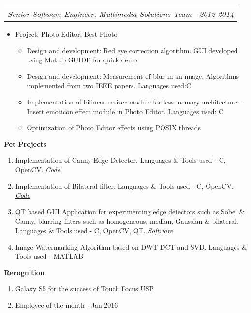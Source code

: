 \documentclass[letterpaper,11pt]{article}
\makeatletter
\def\CC{{C\nolinebreak[4]\hspace{-.05em}\raisebox{.4ex}{\tiny\bf ++}}}
\newcommand{\resitem}[1]{\item #1 \vspace{-2pt}}
\newcommand{\resheading}[1]{{\large \colorbox{mygrey}{\begin{minipage}{\textwidth}{\textbf{#1 \vphantom{p\^{E}}}}\end{minipage}}}}
\newcommand{\ressubheading}[4]{
	\begin{tabular*}{7.0in}{l@{\extracolsep{\fill}}r}
		\textbf{#1} & #2 \\
		\textit{#3} & \textit{#4} \\
	\end{tabular*}\vspace{-6pt}}
\makeatother
\begin{document}
\begin{itemize}
		\ressubheading{}{}{Senior Software Engineer, Multimedia Solutions Team}{2012-2014}
		\begin{itemize}
				\resitem[]{\faCircleO \hspace{1mm}Project: Photo Editor, Best Photo.}
				\begin{itemize}
						\resitem{Design and development: Red eye correction algorithm. GUI developed using Matlab GUIDE for quick demo }
						\resitem{Design and development: Measurement of blur in an image. Algorithms implemented from two IEEE papers. 
							Languages used:\CC}
						\resitem{Implementation of bilinear resizer module for less memory architecture - Insert emoticon effect module in Photo Editor. 
							Languages used: C}
						\resitem{Optimization of Photo Editor effects using POSIX threads}
				\end{itemize}
		\end{itemize}

\end{itemize}

\resheading{Pet Projects}
\begin{enumerate}
	\item Implementation of Canny Edge Detector. Languages \& Tools used - \CC, OpenCV.
		\faGithub \hspace{1mm}\href{https://github.com/nrupatunga/Canny-Edge-Detector}{\emph{Code}}
	\item Implementation of Bilateral filter. Languages \& Tools used - \CC, OpenCV.
		\faGithub \hspace{1mm}\href{https://github.com/nrupatunga/Bilateral-Filter}{\emph{Code}}
	\item QT based GUI Application for experimenting edge detectors such as Sobel \& Canny, blurring filters such as homogeneous, median, Gaussian \& bilateral. 
		Languages \& Tools used - \CC, OpenCV, QT. 
		\faWindows \hspace{1mm}\href{https://github.com/nrupatunga/Computer-Vision-Tool}{\emph{Software}}
	\item Image Watermarking Algorithm based on DWT DCT and SVD.  Languages \& Tools used - MATLAB
\end{enumerate}

\resheading{Recognition}
\begin{enumerate}
	\item Galaxy S5 for the success of Touch Focus USP
	\item Employee of the month - Jan 2016
\end{enumerate}
\end{document}
